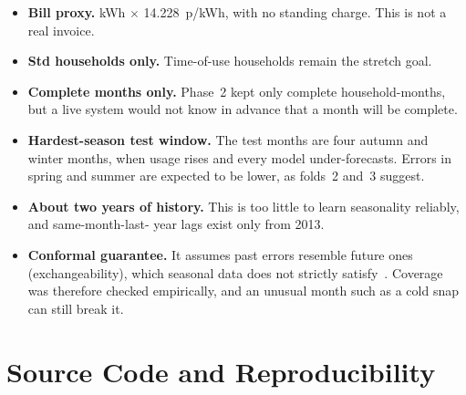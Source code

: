 \documentclass[11pt,letterpaper]{article}
\begin{document}
\begin{itemize}
  \item \textbf{Bill proxy.} kWh $\times$ 14.228~p/kWh, with no standing charge. This is not a real invoice.
  \item \textbf{Std households only.} Time-of-use households remain the stretch goal.
  \item \textbf{Complete months only.} Phase~2 kept only complete household-months, but a live system would not
  know in advance that a month will be complete.
  \item \textbf{Hardest-season test window.} The test months are four autumn and winter months, when usage rises
  and every model under-forecasts. Errors in spring and summer are expected to be lower, as folds~2 and~3 suggest.
  \item \textbf{About two years of history.} This is too little to learn seasonality reliably, and same-month-last-
  year lags exist only from 2013.
  \item \textbf{Conformal guarantee.} It assumes past errors resemble future ones (exchangeability), which seasonal
  data does not strictly satisfy~\cite{hyndman2021fpp3}. Coverage was therefore checked empirically, and an
  unusual month such as a cold snap can still break it.
\end{itemize}

\section{Source Code and Reproducibility}
\label{sec:code}
\end{document}
